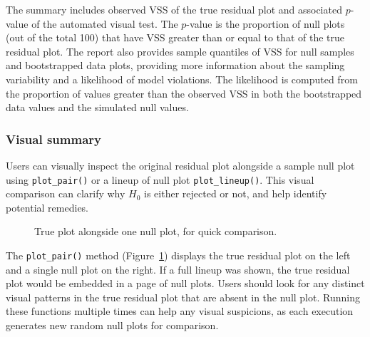 \documentclass[
doublespace,
  times]{anzsauth}
\newenvironment{Shaded}{\begin{snugshade}}{\end{snugshade}}
\newcommand{\FunctionTok}[1]{\textcolor[rgb]{0.28,0.35,0.67}{#1}}
\newcommand{\NormalTok}[1]{\textcolor[rgb]{0.00,0.23,0.31}{#1}}
\newcommand{\SpecialCharTok}[1]{\textcolor[rgb]{0.37,0.37,0.37}{#1}}
\begin{document}
The summary includes observed VSS of the true residual plot and
associated \(p\)-value of the automated visual test. The \(p\)-value is
the proportion of null plots (out of the total 100) that have VSS
greater than or equal to that of the true residual plot. The report also
provides sample quantiles of VSS for null samples and bootstrapped data
plots, providing more information about the sampling variability and a
likelihood of model violations. The likelihood is computed from the
proportion of values greater than the observed VSS in both the
bootstrapped data values and the simulated null values.

\subsubsection{Visual summary}\label{sec-autovi-visual}

Users can visually inspect the original residual plot alongside a sample
null plot using \texttt{plot\_pair()} or a lineup of null plot
\texttt{plot\_lineup()}. This visual comparison can clarify why \(H_0\)
is either rejected or not, and help identify potential remedies.

\begin{Shaded}
\end{Shaded}

\begin{figure}[H]


\caption{\label{fig-plot-pair}True plot alongside one null plot, for
quick comparison.}

\end{figure}%

The \texttt{plot\_pair()} method (Figure~\ref{fig-plot-pair}) displays
the true residual plot on the left and a single null plot on the right.
If a full lineup was shown, the true residual plot would be embedded in
a page of null plots. Users should look for any distinct visual patterns
in the true residual plot that are absent in the null plot. Running
these functions multiple times can help any visual suspicions, as each
execution generates new random null plots for comparison.
\end{document}
